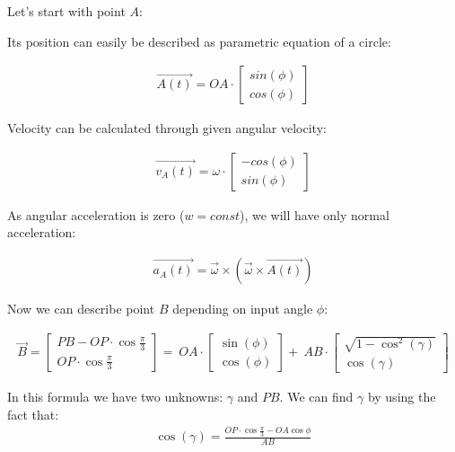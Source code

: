 \documentclass{article}
\begin{document}
Let's start with point $A$:

Its position can easily be described as parametric equation of a circle:

\begin{align}
    \vec{A(t)} = OA \cdot \begin{bmatrix}
        sin{(\phi)} \\
        cos{(\phi)}
    \end{bmatrix}
\end{align}

Velocity can be calculated through given angular velocity:

\begin{align}
    \vec{v_A(t)} = \omega \cdot \begin{bmatrix}
        -cos{(\phi)} \\
        sin{(\phi)}
    \end{bmatrix}
\end{align}

As angular acceleration is zero ($w = const$), we will have only normal acceleration:

\begin{align}
    \vec{a_A(t)} = \vec{\omega} \times ( \vec{\omega} \times \vec{A(t)} )
\end{align}

Now we can describe point $B$ depending on input angle $\phi$:

\begin{align}
    \vec{B} = \begin{bmatrix}
        PB - OP \cdot \cos{\frac{\pi}{3}} \\
        OP \cdot \cos{\frac{\pi}{3}}
    \end{bmatrix} = \
    OA \cdot \begin{bmatrix}
        \sin{(\phi)} \\
        \cos{(\phi)}
    \end{bmatrix} + \
    AB \cdot \begin{bmatrix}
        \sqrt{1 - \cos^2{(\gamma)}} \\
        \cos{(\gamma)}
    \end{bmatrix}
\end{align}

In this formula we have two unknowns: $\gamma$ and $PB$.
We can find $\gamma$ by using the fact that:
\begin{align}
    \cos{(\gamma)} = \frac{OP \cdot \cos{\frac{\pi}{3}} - OA \cos{\phi}}{AB}
\end{align}
\end{document}
